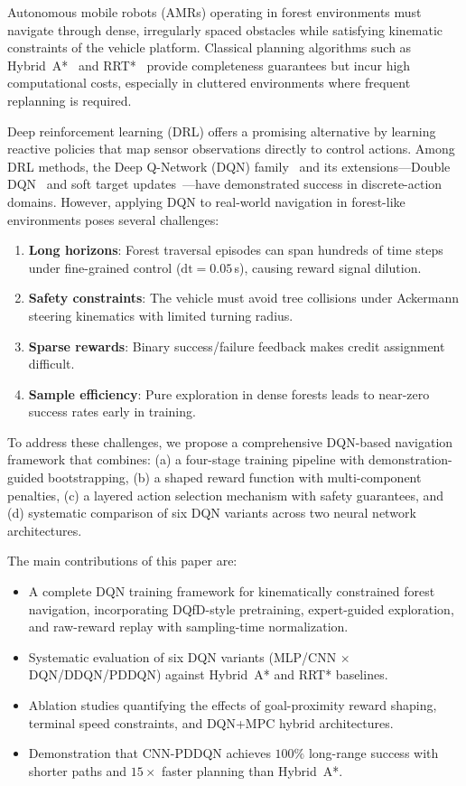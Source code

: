 \documentclass[conference]{IEEEtran}
\begin{document}
Autonomous mobile robots (AMRs) operating in forest environments must navigate through dense, irregularly spaced obstacles while satisfying kinematic constraints of the vehicle platform.
Classical planning algorithms such as Hybrid~A*~\cite{dolgov2010path} and RRT*~\cite{karaman2011sampling} provide completeness guarantees but incur high computational costs, especially in cluttered environments where frequent replanning is required.

Deep reinforcement learning (DRL) offers a promising alternative by learning reactive policies that map sensor observations directly to control actions.
Among DRL methods, the Deep Q-Network (DQN) family~\cite{mnih2015human} and its extensions---Double DQN~\cite{van2016deep} and soft target updates~\cite{lillicrap2015continuous}---have demonstrated success in discrete-action domains.
However, applying DQN to real-world navigation in forest-like environments poses several challenges:
\begin{enumerate}
    \item \textbf{Long horizons}: Forest traversal episodes can span hundreds of time steps under fine-grained control ($\text{dt} = 0.05$\,s), causing reward signal dilution.
    \item \textbf{Safety constraints}: The vehicle must avoid tree collisions under Ackermann steering kinematics with limited turning radius.
    \item \textbf{Sparse rewards}: Binary success/failure feedback makes credit assignment difficult.
    \item \textbf{Sample efficiency}: Pure exploration in dense forests leads to near-zero success rates early in training.
\end{enumerate}

To address these challenges, we propose a comprehensive DQN-based navigation framework that combines:
(a) a four-stage training pipeline with demonstration-guided bootstrapping,
(b) a shaped reward function with multi-component penalties,
(c) a layered action selection mechanism with safety guarantees,
and (d) systematic comparison of six DQN variants across two neural network architectures.

The main contributions of this paper are:
\begin{itemize}
    \item A complete DQN training framework for kinematically constrained forest navigation, incorporating DQfD-style pretraining, expert-guided exploration, and raw-reward replay with sampling-time normalization.
    \item Systematic evaluation of six DQN variants (MLP/CNN $\times$ DQN/DDQN/PDDQN) against Hybrid~A* and RRT* baselines.
    \item Ablation studies quantifying the effects of goal-proximity reward shaping, terminal speed constraints, and DQN+MPC hybrid architectures.
    \item Demonstration that CNN-PDDQN achieves $100\%$ long-range success with shorter paths and $15\times$ faster planning than Hybrid~A*.
\end{itemize}
\end{document}
